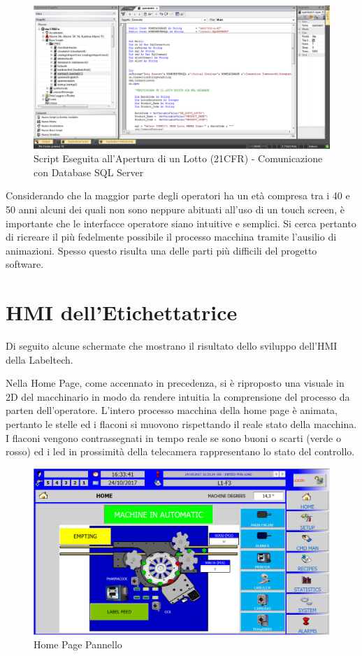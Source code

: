 \documentclass[12pt, a4paper, oneside]{book}
\begin{document}
\begin{figure}[H]
	\centering
	\includegraphics[width=13cm]{Immagini/HMI3}
	\caption{Script Eseguita all'Apertura di un Lotto (21CFR) - Comunicazione con Database SQL Server}
	\label{HMI3}
\end{figure}

Considerando che la maggior parte degli operatori ha un età compresa tra i 40 e 50 anni alcuni dei quali non sono neppure abituati all'uso di un touch screen, è importante che le interfacce operatore siano intuitive e semplici. Si cerca pertanto di ricreare il più fedelmente possibile il processo macchina tramite l'ausilio di animazioni. Spesso questo risulta una delle parti più difficili del progetto software.

\section{HMI dell'Etichettatrice}

Di seguito alcune schermate che mostrano il risultato dello sviluppo dell'HMI della Labeltech.

Nella Home Page, come accennato in precedenza, si è riproposto una visuale in 2D del macchinario in modo da rendere intuitia la comprensione del processo da parten dell'operatore. L'intero processo macchina della home page è animata, pertanto le stelle ed i flaconi si muovono rispettando il reale stato della macchina. I flaconi vengono contrassegnati in tempo reale se sono buoni o scarti (verde o rosso) ed i led in prossimità della telecamera rappresentano lo stato del controllo.
\begin{figure}[H]
	\centering
	\includegraphics[width=13cm]{Immagini/HMI6}
	\caption{Home Page Pannello}
	\label{HMI6}
\end{figure}
\end{document}
